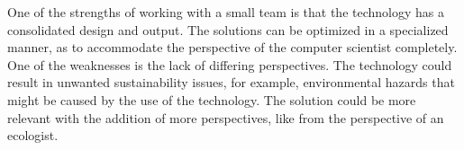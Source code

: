 One of the strengths of working with a small team is that the technology has a consolidated design and output. The solutions can be optimized in a specialized manner, as to accommodate the perspective of the computer scientist completely. 
One of the weaknesses is the lack of differing perspectives. 
The technology could result in unwanted sustainability issues, for example, environmental hazards that might be caused by the use of the technology. 
The solution could be more relevant with the addition of more perspectives, like from the perspective of an ecologist.
